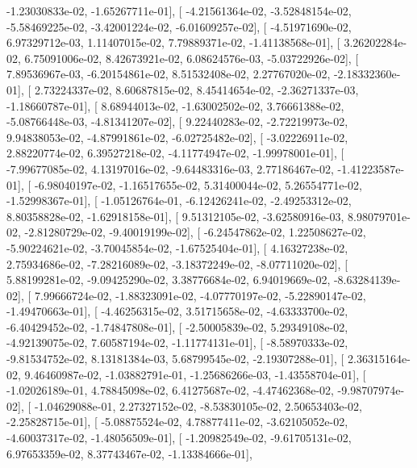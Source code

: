 \documentclass{article}
\begin{document}
         -1.23030833e-02,  -1.65267711e-01],
       [ -4.21561364e-02,  -3.52848154e-02,  -5.58469225e-02,
         -3.42001224e-02,  -6.01609257e-02],
       [ -4.51971690e-02,   6.97329712e-03,   1.11407015e-02,
          7.79889371e-02,  -1.41138568e-01],
       [  3.26202284e-02,   6.75091006e-02,   8.42673921e-02,
          6.08624576e-03,  -5.03722926e-02],
       [  7.89536967e-03,  -6.20154861e-02,   8.51532408e-02,
          2.27767020e-02,  -2.18332360e-01],
       [  2.73224337e-02,   8.60687815e-02,   8.45414654e-02,
         -2.36271337e-03,  -1.18660787e-01],
       [  8.68944013e-02,  -1.63002502e-02,   3.76661388e-02,
         -5.08766448e-03,  -4.81341207e-02],
       [  9.22440283e-02,  -2.72219973e-02,   9.94838053e-02,
         -4.87991861e-02,  -6.02725482e-02],
       [ -3.02226911e-02,   2.88220774e-02,   6.39527218e-02,
         -4.11774947e-02,  -1.99978001e-01],
       [ -7.99677085e-02,   4.13197016e-02,  -9.64483316e-03,
          2.77186467e-02,  -1.41223587e-01],
       [ -6.98040197e-02,  -1.16517655e-02,   5.31400044e-02,
          5.26554771e-02,  -1.52998367e-01],
       [ -1.05126764e-01,  -6.12426241e-02,  -2.49253312e-02,
          8.80358828e-02,  -1.62918158e-01],
       [  9.51312105e-02,  -3.62580916e-03,   8.98079701e-02,
         -2.81280729e-02,  -9.40019199e-02],
       [ -6.24547862e-02,   1.22508627e-02,  -5.90224621e-02,
         -3.70045854e-02,  -1.67525404e-01],
       [  4.16327238e-02,   2.75934686e-02,  -7.28216089e-02,
         -3.18372249e-02,  -8.07711020e-02],
       [  5.88199281e-02,  -9.09425290e-02,   3.38776684e-02,
          6.94019669e-02,  -8.63284139e-02],
       [  7.99666724e-02,  -1.88323091e-02,  -4.07770197e-02,
         -5.22890147e-02,  -1.49470663e-01],
       [ -4.46256315e-02,   3.51715658e-02,  -4.63333700e-02,
         -6.40429452e-02,  -1.74847808e-01],
       [ -2.50005839e-02,   5.29349108e-02,  -4.92139075e-02,
          7.60587194e-02,  -1.11774131e-01],
       [ -8.58970333e-02,  -9.81534752e-02,   8.13181384e-03,
          5.68799545e-02,  -2.19307288e-01],
       [  2.36315164e-02,   9.46460987e-02,  -1.03882791e-01,
         -1.25686266e-03,  -1.43558704e-01],
       [ -1.02026189e-01,   4.78845098e-02,   6.41275687e-02,
         -4.47462368e-02,  -9.98707974e-02],
       [ -1.04629088e-01,   2.27327152e-02,  -8.53830105e-02,
          2.50653403e-02,  -2.25828715e-01],
       [ -5.08875524e-02,   4.78877411e-02,  -3.62105052e-02,
         -4.60037317e-02,  -1.48056509e-01],
       [ -1.20982549e-02,  -9.61705131e-02,   6.97653359e-02,
          8.37743467e-02,  -1.13384666e-01],
\end{document}
